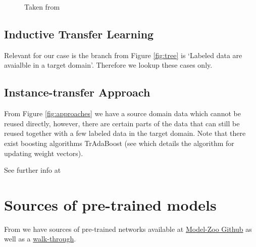 \documentclass[11pt]{article}
\begin{document}
\begin{figure}[H]


    \caption{Taken from \cite{survey-on-transfer-learning}}
\end{figure}    

\subsection{Inductive Transfer Learning}

Relevant for our case is the branch from Figure \ref{fig:tree} is `Labeled data are avaialble in a target domain'. Therefore we lookup these cases only.

\subsection{Instance-transfer Approach}

From Figure \ref{fig:approaches} we have a source domain data which cannot be reused directly, however, there are certain parts of the data that can still be reused together with a few labeled data in the target domain. Note that there exist boosting algorithms TrAdaBoost (see \cite{transfer-learning-boosting} which details the algorithm for updating weight vectors).

\vspace{1em}

See further info at \cite{survey-on-transfer-learning}

\section{Sources of pre-trained models}

From \cite{gentle-introduction-to-transfer-learning} we have sources of pre-trained networks available at \href{https://github.com/BVLC/caffe/wiki/Model-Zoo}{Model-Zoo Github} as well as a \href{https://machinelearningmastery.com/how-to-use-transfer-learning-when-developing-convolutional-neural-network-models/}{walk-through}.

\printbibliography
\end{document}
